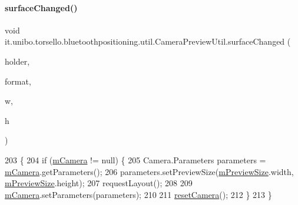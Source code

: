 \paragraph{\texorpdfstring{surface\+Changed()}{surfaceChanged()}}
{\footnotesize\ttfamily void it.\+unibo.\+torsello.\+bluetoothpositioning.\+util.\+Camera\+Preview\+Util.\+surface\+Changed (\begin{DoxyParamCaption}\item[{Surface\+Holder}]{holder,  }\item[{int}]{format,  }\item[{int}]{w,  }\item[{int}]{h }\end{DoxyParamCaption})}


\begin{DoxyCode}
203                                                                                \{
204         \textcolor{keywordflow}{if} (\hyperlink{classit_1_1unibo_1_1torsello_1_1bluetoothpositioning_1_1util_1_1CameraPreviewUtil_a7ee402da8ec64412f9a68e68b4025eea_a7ee402da8ec64412f9a68e68b4025eea}{mCamera} != null) \{
205             Camera.Parameters parameters = \hyperlink{classit_1_1unibo_1_1torsello_1_1bluetoothpositioning_1_1util_1_1CameraPreviewUtil_a7ee402da8ec64412f9a68e68b4025eea_a7ee402da8ec64412f9a68e68b4025eea}{mCamera}.getParameters();
206             parameters.setPreviewSize(\hyperlink{classit_1_1unibo_1_1torsello_1_1bluetoothpositioning_1_1util_1_1CameraPreviewUtil_a48550a4bc1d9358ae5de55f1109a2966_a48550a4bc1d9358ae5de55f1109a2966}{mPreviewSize}.width, 
      \hyperlink{classit_1_1unibo_1_1torsello_1_1bluetoothpositioning_1_1util_1_1CameraPreviewUtil_a48550a4bc1d9358ae5de55f1109a2966_a48550a4bc1d9358ae5de55f1109a2966}{mPreviewSize}.height);
207             requestLayout();
208 
209             \hyperlink{classit_1_1unibo_1_1torsello_1_1bluetoothpositioning_1_1util_1_1CameraPreviewUtil_a7ee402da8ec64412f9a68e68b4025eea_a7ee402da8ec64412f9a68e68b4025eea}{mCamera}.setParameters(parameters);
210 
211             \hyperlink{classit_1_1unibo_1_1torsello_1_1bluetoothpositioning_1_1util_1_1CameraPreviewUtil_a5240e32d2ccac682cf80c639accea5da_a5240e32d2ccac682cf80c639accea5da}{resetCamera}();
212         \}
213     \}
\end{DoxyCode}
\hypertarget{classit_1_1unibo_1_1torsello_1_1bluetoothpositioning_1_1util_1_1CameraPreviewUtil_a88d3e6e94bb5cb4c73e8155e009b6270_a88d3e6e94bb5cb4c73e8155e009b6270}{}\label{classit_1_1unibo_1_1torsello_1_1bluetoothpositioning_1_1util_1_1CameraPreviewUtil_a88d3e6e94bb5cb4c73e8155e009b6270_a88d3e6e94bb5cb4c73e8155e009b6270} 

